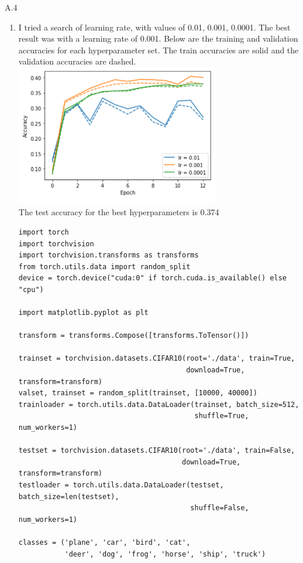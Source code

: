 \documentclass{article}
\begin{document}
\newpage

A.4

\begin{enumerate}
        \item I tried a search of learning rate, with values of 0.01, 0.001, 0.0001.
        The best result was with a learning rate of 0.001.
        Below are the training and validation accuracies for each hyperparameter set.
        The train accuracies are solid and the validation accuracies are dashed. \\
        \includegraphics[width=0.7\textwidth]{code/A4a.png} \\
        The test accuracy for the best hyperparameters is 0.374
        \begin{verbatim}
import torch
import torchvision
import torchvision.transforms as transforms
from torch.utils.data import random_split
device = torch.device("cuda:0" if torch.cuda.is_available() else "cpu")

import matplotlib.pyplot as plt

transform = transforms.Compose([transforms.ToTensor()])

trainset = torchvision.datasets.CIFAR10(root='./data', train=True,
                                        download=True, transform=transform)
valset, trainset = random_split(trainset, [10000, 40000])
trainloader = torch.utils.data.DataLoader(trainset, batch_size=512,
                                          shuffle=True, num_workers=1)

testset = torchvision.datasets.CIFAR10(root='./data', train=False,
                                       download=True, transform=transform)
testloader = torch.utils.data.DataLoader(testset, batch_size=len(testset),
                                         shuffle=False, num_workers=1)

classes = ('plane', 'car', 'bird', 'cat',
           'deer', 'dog', 'frog', 'horse', 'ship', 'truck')


\end{verbatim}
\end{enumerate}
\end{document}

